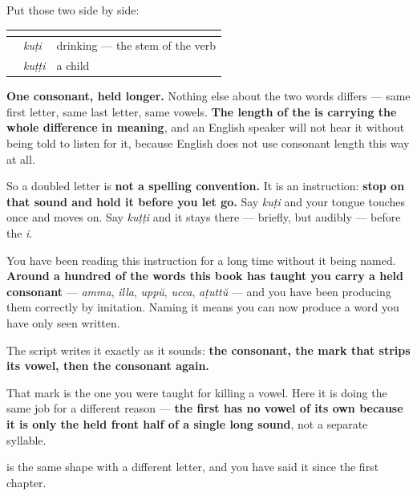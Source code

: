 \begin{grammarlens}[title={Grammar Lens: hold it, and it is a different word}]
Put those two side by side:

\noindent
\begin{tabularx}{\linewidth}{@{}>{\raggedright\arraybackslash}X>{\raggedright\arraybackslash}X>{\raggedright\arraybackslash}X@{}}
\toprule
\textbf{} & \textbf{} & \textbf{} \\
\midrule
\textbf{\ml{കുടി}} & \emph{kuṭi} & drinking — the stem of the verb \\
\textbf{\ml{കുട്ടി}} & \emph{kuṭṭi} & a child \\
\bottomrule
\end{tabularx}

\textbf{One consonant, held longer.} Nothing else about the two words differs — same first letter, same last letter, same vowels. \textbf{The length of the  is carrying the whole difference in meaning}, and an English speaker will not hear it without being told to listen for it, because English does not use consonant length this way at all.

So a doubled letter is \textbf{not a spelling convention.} It is an instruction: \textbf{stop on that sound and hold it before you let go.} Say \emph{kuṭi} and your tongue touches once and moves on. Say \emph{kuṭṭi} and it stays there — briefly, but audibly — before the \emph{i}.

You have been reading this instruction for a long time without it being named. \textbf{Around a hundred of the words this book has taught you carry a held consonant} — \emph{amma}, \emph{illa}, \emph{uppŭ}, \emph{ucca}, \emph{aṭuttŭ} — and you have been producing them correctly by imitation. Naming it means you can now produce a word you have only seen written.
\end{grammarlens}

\begin{culture}
The script writes it exactly as it sounds: \textbf{the consonant, the mark that strips its vowel, then the consonant again.}

That mark is the one you were taught for killing a vowel. Here it is doing the same job for a different reason — \textbf{the first  has no vowel of its own because it is only the held front half of a single long sound}, not a separate syllable.

\textbf{} is the same shape with a different letter, and you have said it since the first chapter.
\end{culture}

